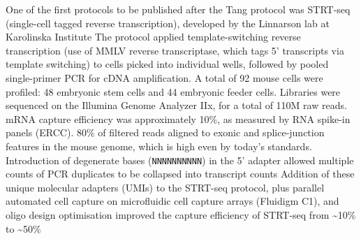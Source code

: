 One of the first protocols to be published after the Tang protocol was STRT-seq (single-cell tagged reverse transcription), developed by the Linnarson lab at Karolinska Institute The protocol applied template-switching reverse transcription (use of MMLV reverse transcriptase, which tags 5' transcripts via template switching) to cells picked into individual wells, followed by pooled single-primer PCR for cDNA amplification. A total of 92 mouse cells were profiled: 48 embryonic stem cells and 44 embryonic feeder cells. Libraries were sequenced on the Illumina Genome Analyzer IIx, for a total of 110M raw reads. mRNA capture efficiency was approximately 10\%, as measured by RNA spike-in panels (ERCC). 80\% of filtered reads aligned to exonic and splice-junction features in the mouse genome, which is high even by today's standards. Introduction of degenerate bases (\verb|NNNNNNNNNN|) in the 5' adapter allowed multiple counts of PCR duplicates to be collapsed into transcript counts Addition of these unique molecular adapters (UMIs) to the STRT-seq protocol, plus parallel automated cell capture on microfluidic cell capture arrays (Fluidigm C1), and oligo design optimisation improved the capture efficiency of STRT-seq from \textasciitilde{10}\% to \textasciitilde{50}\% 



